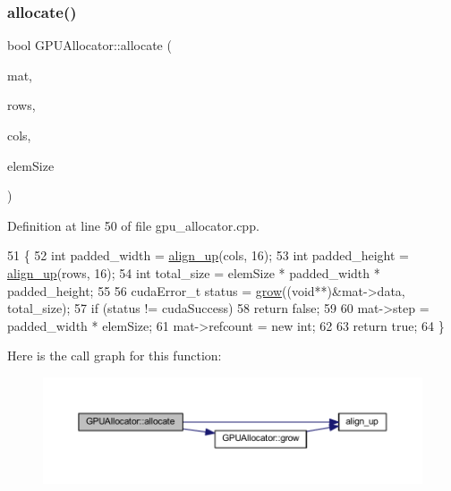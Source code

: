 \subsubsection{\texorpdfstring{allocate()}{allocate()}}
{\footnotesize\ttfamily bool G\+P\+U\+Allocator\+::allocate (\begin{DoxyParamCaption}\item[{\mbox{\hyperlink{gpu__allocator_8h_aa7700da124206551c0f9d273152f13fb}{Gpu\+Mat}} $\ast$}]{mat,  }\item[{int}]{rows,  }\item[{int}]{cols,  }\item[{size\+\_\+t}]{elem\+Size }\end{DoxyParamCaption})}



Definition at line 50 of file gpu\+\_\+allocator.\+cpp.


\begin{DoxyCode}
51 \{
52     \textcolor{keywordtype}{int} padded\_width  = \mbox{\hyperlink{gpu__allocator_8cpp_a9b5b2c4640739b3faa5bdeae80af1e42}{align\_up}}(cols, 16);
53     \textcolor{keywordtype}{int} padded\_height = \mbox{\hyperlink{gpu__allocator_8cpp_a9b5b2c4640739b3faa5bdeae80af1e42}{align\_up}}(rows, 16);
54     \textcolor{keywordtype}{int} total\_size = elemSize * padded\_width * padded\_height;
55 
56     cudaError\_t status = \mbox{\hyperlink{class_g_p_u_allocator_a04e2127f194094b27fe2351551c7ddeb}{grow}}((\textcolor{keywordtype}{void}**)&mat->data, total\_size);
57     \textcolor{keywordflow}{if} (status != cudaSuccess)
58         \textcolor{keywordflow}{return} \textcolor{keyword}{false};
59 
60     mat->step = padded\_width * elemSize;
61     mat->refcount = \textcolor{keyword}{new} int;
62 
63     \textcolor{keywordflow}{return} \textcolor{keyword}{true};
64 \}
\end{DoxyCode}
Here is the call graph for this function\+:\nopagebreak
\begin{figure}[H]
\begin{center}
\leavevmode
\includegraphics[width=350pt]{class_g_p_u_allocator_abe0cecfd551e4824ed5522721dea76ca_cgraph}
\end{center}
\end{figure}
\mbox{\label{class_g_p_u_allocator_a539a3d2909976f47ca7d109522c23ece}} 

